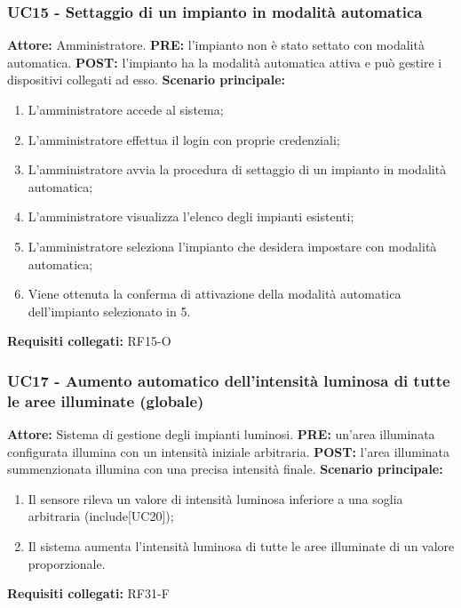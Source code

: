 \documentclass[a4paper, 12pt]{article}
\begin{document}
\subsubsection{UC15 - Settaggio di un impianto in modalità automatica}
\textbf{Attore:} Amministratore.\newline
\textbf{PRE:} l'impianto non è stato settato con modalità automatica.\newline
\textbf{POST:} l'impianto ha la modalità automatica attiva e può gestire i dispositivi collegati ad esso.\newline
\textbf{Scenario principale:}
\begin{enumerate}
    \item L'amministratore accede al sistema;
    \item L'amministratore effettua il login con proprie credenziali;
    \item L'amministratore avvia la procedura di settaggio di un impianto in modalità automatica;
    \item L'amministratore visualizza l'elenco degli impianti esistenti;
    \item L'amministratore seleziona l'impianto che desidera impostare con modalità automatica;
    \item Viene ottenuta la conferma di attivazione della modalità automatica dell'impianto selezionato in 5.
\end{enumerate}
\textbf{Requisiti collegati:} RF15-O\newline

\subsubsection{UC17 - Aumento automatico dell'intensità luminosa di tutte le aree illuminate (globale)}
\textbf{Attore:} Sistema di gestione degli impianti luminosi.\newline
\textbf{PRE:} un'area illuminata configurata illumina con un intensità iniziale arbitraria.\newline
\textbf{POST:} l'area illuminata summenzionata illumina con una precisa intensità finale.\newline
\textbf{Scenario principale:}
\begin{enumerate}
    \item Il sensore rileva un valore di intensità luminosa inferiore a una soglia arbitraria (include[UC20]);
    \item Il sistema aumenta l’intensità luminosa di tutte le aree illuminate di un valore proporzionale.
\end{enumerate}
\textbf{Requisiti collegati:} RF31-F\newline
\end{document}
